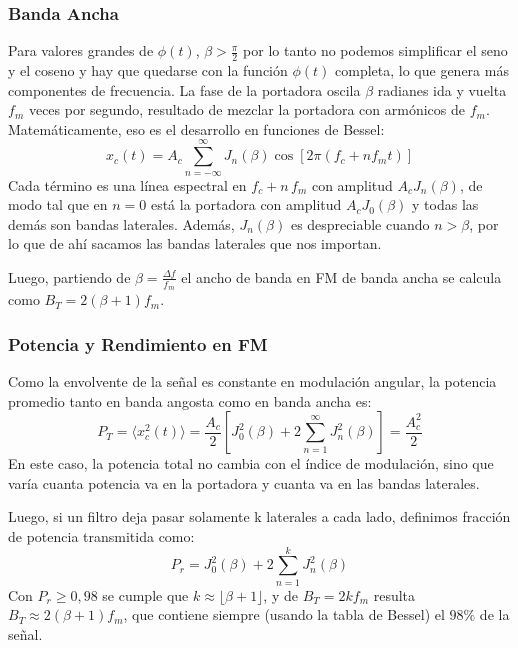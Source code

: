 \documentclass[11pt,a4paper]{article}
\numberwithin{equation}{section}
\begin{document}
\subsubsection{Banda Ancha}
Para valores grandes de $\phi (t)$, $\beta > \frac{\pi}{2}$ por lo tanto no podemos simplificar el seno y el coseno y hay que quedarse con la función $\phi (t)$ completa, lo que genera más componentes de frecuencia. La fase de la portadora oscila $\beta$ radianes ida y vuelta $f_m$ veces por segundo, resultado de mezclar la portadora con armónicos de $f_m$. Matemáticamente, eso es el desarrollo en funciones de Bessel:
\begin{equation}
  x_c(t) = A_c\sum_{n=-\infty}^{\infty} J_n(\beta)\cos[2\pi(f_c+nf_mt)]
\end{equation}
Cada término es una línea espectral en $f_c+n\,f_m$ con amplitud $A_cJ_n(\beta)$, de modo tal que en $n=0$ está la portadora con amplitud $A_cJ_0(\beta)$ y todas las demás son bandas laterales. Además, $J_n(\beta)$ es despreciable cuando $n>\beta$, por lo que de ahí sacamos las bandas laterales que nos importan.

Luego, partiendo de $\beta = \frac{\Delta f}{f_m}$ el ancho de banda en FM de banda ancha se calcula como $B_T=2(\beta+1)f_m$. 

\subsubsection{Potencia y Rendimiento en FM}
Como la envolvente de la señal es constante en modulación angular, la potencia promedio tanto en banda angosta como en banda ancha es:
\begin{equation}
  P_T=\langle x_c^2(t)\rangle =\frac{A_c}{2}\left[ J_0^2(\beta) + 2 \sum_{n=1}^{\infty} J_n^2(\beta) \right]=\frac{A_c^2}{2}
\end{equation}
En este caso, la potencia total no cambia con el índice de modulación, sino que varía cuanta potencia va en la portadora y cuanta va en las bandas laterales.

Luego, si un filtro deja pasar solamente k laterales a cada lado, definimos fracción de potencia transmitida como:
\begin{equation}
  P_r=J_0^2(\beta) + 2 \sum_{n=1}^{k} J_n^2(\beta)
\end{equation}
Con $P_r \geq 0,98$ se cumple que $k \approx \lfloor \beta + 1 \rfloor$, y de $B_T=2kf_m$ resulta $B_T\approx 2(\beta + 1)f_m$, que contiene siempre (usando la tabla de Bessel) el $98\%$ de la señal.
\end{document}
